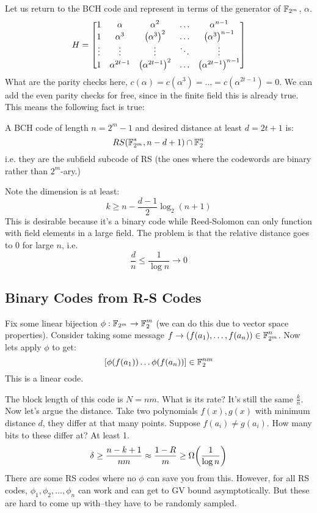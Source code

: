 Let us return to the BCH code and represent in terms of the
generator of $\operatorname{\mathbb{F}}_{2^m}$, $\alpha$.
\[ H = \begin{bmatrix}
    1 & \alpha & \alpha^2 & \dots & \alpha^{n - 1} \\
    1 & \alpha^3 & \qty(\alpha^3)^2 & \dots & \qty(\alpha^3)^{n - 1} \\
    \vdots & \vdots & \vdots & \ddots & \vdots \\
    1 & \alpha^{2t - 1} & \qty(\alpha^{2t - 1})^2 & \dots &  \qty(\alpha^{2t - 1})^{n - 1}
\end{bmatrix} \]
What are the parity checks here, $c(\alpha) = c(\alpha^3) = \dots = c(\alpha^{2t - 1}) = 0$.
We can add the even parity checks for free, since in the finite field this is already true. This means the following fact is true:
\begin{theorem}
    A BCH code of length $n = 2^m - 1$ and desired distance at least $d = 2t + 1$ is:
    \[ RS(\operatorname{\mathbb{F}}_{2^m}^*, n - d + 1) \cap \operatorname{\mathbb{F}}_2^n \]
    i.e. they are the subfield subcode of RS (the ones where the codewords are binary rather than $2^m$-ary.)
\end{theorem}
Note the dimension is at least:
\[ k \geq n - \frac{d - 1}{2} \log_2 (n + 1) \]
This is desirable because it's a binary code while Reed-Solomon can only function
with field elements in a large field. The problem is that the relative distance goes to $0$ for large $n$, i.e.
\[ \frac{d}{n} \leq \frac{1}{\log n} \to 0 \]

\subsection{Binary Codes from R-S Codes}
Fix some linear bijection $\phi: \operatorname{\mathbb{F}}_{2^m} \to \operatorname{\mathbb{F}}_2^m$ (we can do this due to vector space properties).
Consider taking some message $f \to (f(a_1), \dots, f(a_n)) \in \operatorname{\mathbb{F}}_{2^m}^n$.
Now lets apply $\phi$ to get:
\[ \qty[\phi(f(a_1)) \dots \phi(f(a_n))] \in \operatorname{\mathbb{F}}_2^{nm} \]
This is a linear code.

The block length of this code is $N = nm$. What is its rate? It's still the same $\frac{k}{n}$.
Now let's argue the distance. Take two polynomials $f(x), g(x)$ with minimum distance $d$, they differ at that many points.
Suppose $f(a_i) \neq g(a_i)$. How many bits to these differ at? At least 1.
\[ \delta \geq \frac{n - k + 1}{nm} \approx \frac{1 - R}{m} \geq \Omega\qty(\frac{1}{\log n}) \]
There are some RS codes where no $\phi$ can save you from this. However,
for all RS codes, $\phi_1, \phi_2, \dots, \phi_n$ can work and can get to GV bound asymptotically.
But these are hard to come up with--they have to be randomly sampled.

